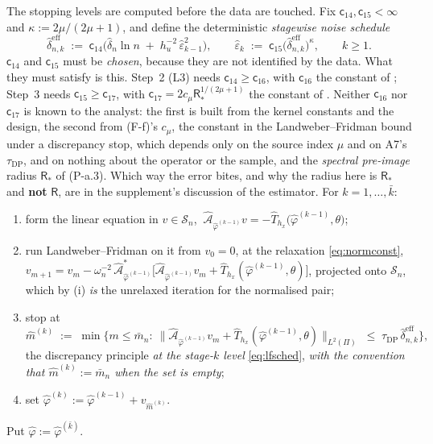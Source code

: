 \begin{definition}
The stopping levels are computed before the data are touched. Fix $\mathsf c_{14},\mathsf c_{15}<\infty$
and $\kappa:=2\mu/(2\mu+1)$, and define the deterministic \emph{stagewise noise schedule}
\begin{equation}\label{eq:lfsched}
\hat\delta^{\mathrm{eff}}_{n,k}\;:=\;\mathsf c_{14}\Big(\hat\delta_n\ln n\;+\;h_u^{-2}\,\hat\varepsilon_{k-1}^{2}\Big),
\qquad
\hat\varepsilon_{k}\;:=\;\mathsf c_{15}\big(\hat\delta^{\mathrm{eff}}_{n,k}\big)^{\kappa},
\qquad k\ge1 .
\end{equation}
$\mathsf c_{14}$ and $\mathsf c_{15}$ must be
\emph{chosen}, because they are not identified by the data. What they must satisfy is this.
 Step~2
(L3) needs $\mathsf c_{14}\ge\mathsf c_{16}$, with $\mathsf c_{16}$ the constant of ;
Step~3 needs $\mathsf c_{15}\ge\mathsf c_{17}$, with $\mathsf c_{17}=2c_\mu\mathsf R_\ast^{1/(2\mu+1)}$
the constant of . Neither $\mathsf c_{16}$ nor $\mathsf c_{17}$ is known to the analyst:
the first is built from the kernel constants and the design, the second from (F-f)'s $c_\mu$, the
constant in the Landweber--Fridman bound under a discrepancy stop, which depends only on the source
index $\mu$ and on A7's $\tau_{\mathrm{DP}}$, and on nothing about the operator or the sample, 
and the \emph{spectral pre-image} radius $\mathsf R_\ast$ of (P-a.3). Which way the error bites, and why the
radius here is $\mathsf R_\ast$ and \textbf{not} $\mathsf R$, are in the supplement's discussion of the
estimator. For $k=1,\dots,\bar k$:
\begin{enumerate}
\item[(a)] form the linear equation in $v\in\mathcal S_n$,
$\ \hat{\mathcal A}_{\hat\varphi^{(k-1)}}v=-\hat T_{h_x}\big(\hat\varphi^{(k-1)},\theta\big)$;
\item[(b)] run Landweber--Fridman on it from $v_0=0$, at the relaxation \eqref{eq:normconst},
$v_{m+1}=v_m-\omega_n^{-2}\,\hat{\mathcal A}^\ast_{\hat\varphi^{(k-1)}}\big[\hat{\mathcal A}_{\hat\varphi^{(k-1)}}v_m
+\hat T_{h_x}(\hat\varphi^{(k-1)},\theta)\big]$, projected onto $\mathcal S_n$, which by
(i) \emph{is} the unrelaxed iteration for the normalised pair;
\item[(c)] stop at
\[
\hat m^{(k)}\;:=\;\min\Big\{m\le\bar m_n:\ \big\|\hat{\mathcal A}_{\hat\varphi^{(k-1)}}v_m
+\hat T_{h_x}(\hat\varphi^{(k-1)},\theta)\big\|_{L^{2}(\Pi)}\;\le\;
\tau_{\mathrm{DP}}\,\hat\delta^{\mathrm{eff}}_{n,k}\Big\},
\]
the discrepancy principle \emph{at the stage-$k$ level} \eqref{eq:lfsched}, \emph{with the convention
that $\hat m^{(k)}:=\bar m_n$ when the set is empty};
\item[(d)] set $\hat\varphi^{(k)}:=\hat\varphi^{(k-1)}+v_{\hat m^{(k)}}$.
\end{enumerate}
Put $\hat\varphi:=\hat\varphi^{(\bar k)}$.


\end{definition}
